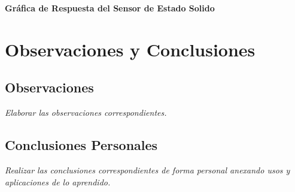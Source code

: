 \documentclass[11pt]{scrartcl}
\newcommand{\indicacion}[1]{\noindent\textit{\small #1}}
\begin{document}
\textbf{Gráfica de Respuesta del Sensor de Estado Solido}
\begin{center}
 \end{center}



\section{Observaciones y Conclusiones}

\subsection{Observaciones}
\indicacion{
    Elaborar las observaciones correspondientes.
}

\subsection{Conclusiones Personales}
\indicacion{
    Realizar las conclusiones correspondientes de forma personal anexando usos y aplicaciones de lo aprendido.
}


  

    
\end{document}
